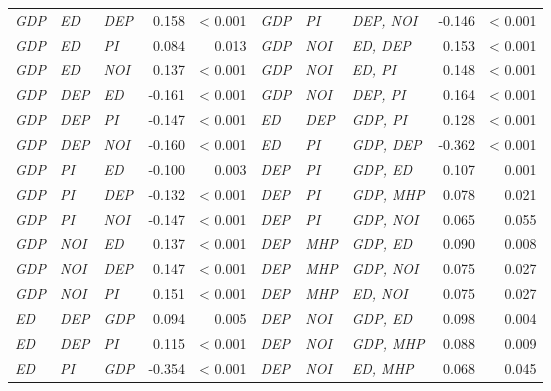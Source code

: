 \begin{tabular}{lllrr|lllrr}
\textit{GDP} & \textit{ED} & \textit{DEP} & 0.158 & \textless{} 0.001 & \textit{GDP} & \textit{PI} & \textit{DEP, NOI} & -0.146 & \textless{} 0.001 \\
\textit{GDP} & \textit{ED} & \textit{PI} & 0.084 & 0.013 & \textit{GDP} & \textit{NOI} & \textit{ED, DEP} & 0.153 & \textless{} 0.001 \\
\textit{GDP} & \textit{ED} & \textit{NOI} & 0.137 & \textless{} 0.001 & \textit{GDP} & \textit{NOI} & \textit{ED, PI} & 0.148 & \textless{} 0.001 \\
\textit{GDP} & \textit{DEP} & \textit{ED} & -0.161 & \textless{} 0.001 & \textit{GDP} & \textit{NOI} & \textit{DEP, PI} & 0.164 & \textless{} 0.001 \\
\textit{GDP} & \textit{DEP} & \textit{PI} & -0.147 & \textless{} 0.001 & \textit{ED} & \textit{DEP} & \textit{GDP, PI} & 0.128 & \textless{} 0.001 \\
\textit{GDP} & \textit{DEP} & \textit{NOI} & -0.160 & \textless{} 0.001 & \textit{ED} & \textit{PI} & \textit{GDP, DEP} & -0.362 & \textless{} 0.001 \\
\textit{GDP} & \textit{PI} & \textit{ED} & -0.100 & 0.003 & \textit{DEP} & \textit{PI} & \textit{GDP, ED} & 0.107 & 0.001 \\
\textit{GDP} & \textit{PI} & \textit{DEP} & -0.132 & \textless{} 0.001 & \textit{DEP} & \textit{PI} & \textit{GDP, MHP} & 0.078 & 0.021 \\
\textit{GDP} & \textit{PI} & \textit{NOI} & -0.147 & \textless{} 0.001 & \textit{DEP} & \textit{PI} & \textit{GDP, NOI} & 0.065 & 0.055 \\
\textit{GDP} & \textit{NOI} & \textit{ED} & 0.137 & \textless{} 0.001 & \textit{DEP} & \textit{MHP} & \textit{GDP, ED} & 0.090 & 0.008 \\
\textit{GDP} & \textit{NOI} & \textit{DEP} & 0.147 & \textless{} 0.001 & \textit{DEP} & \textit{MHP} & \textit{GDP, NOI} & 0.075 & 0.027 \\
\textit{GDP} & \textit{NOI} & \textit{PI} & 0.151 & \textless{} 0.001 & \textit{DEP} & \textit{MHP} & \textit{ED, NOI} & 0.075 & 0.027 \\
\textit{ED} & \textit{DEP} & \textit{GDP} & 0.094 & 0.005 & \textit{DEP} & \textit{NOI} & \textit{GDP, ED} & 0.098 & 0.004 \\
\textit{ED} & \textit{DEP} & \textit{PI} & 0.115 & \textless{} 0.001 & \textit{DEP} & \textit{NOI} & \textit{GDP, MHP} & 0.088 & 0.009 \\
\textit{ED} & \textit{PI} & \textit{GDP} & -0.354 & \textless{} 0.001 & \textit{DEP} & \textit{NOI} & \textit{ED, MHP} & 0.068 & 0.045 \\

\end{tabular}
